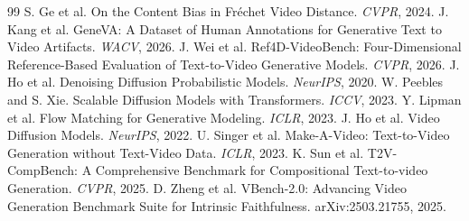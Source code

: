\documentclass[10pt,twocolumn]{article}
\begin{document}
\begin{thebibliography}{99}
 S. Ge et al. On the Content Bias in Fr\'echet Video Distance. \emph{CVPR}, 2024.
 J. Kang et al. GeneVA: A Dataset of Human Annotations for Generative Text to Video Artifacts. \emph{WACV}, 2026.
 J. Wei et al. Ref4D-VideoBench: Four-Dimensional Reference-Based Evaluation of Text-to-Video Generative Models. \emph{CVPR}, 2026.
 J. Ho et al. Denoising Diffusion Probabilistic Models. \emph{NeurIPS}, 2020.
 W. Peebles and S. Xie. Scalable Diffusion Models with Transformers. \emph{ICCV}, 2023.
 Y. Lipman et al. Flow Matching for Generative Modeling. \emph{ICLR}, 2023.
 J. Ho et al. Video Diffusion Models. \emph{NeurIPS}, 2022.
 U. Singer et al. Make-A-Video: Text-to-Video Generation without Text-Video Data. \emph{ICLR}, 2023.
 K. Sun et al. T2V-CompBench: A Comprehensive Benchmark for Compositional Text-to-video Generation. \emph{CVPR}, 2025.
 D. Zheng et al. VBench-2.0: Advancing Video Generation Benchmark Suite for Intrinsic Faithfulness. arXiv:2503.21755, 2025.
\end{thebibliography}
\end{document}
